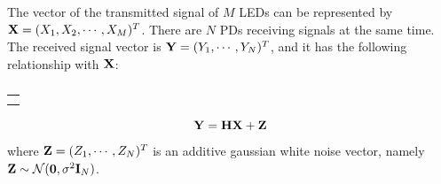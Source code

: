 \documentclass[conference]{IEEEtran}
\begin{document}
   The vector of the transmitted signal of $M$ LEDs can be 
   represented by ${\bf{X}} = {({X_1},{X_2}, \cdots ,{X_M})^T}$. 
   There are $N$ PDs receiving signals at the same 
   time. The received signal vector is ${\bf{Y}} = {({Y_1}, \cdots ,{Y_N})^T}$, 
   and it has the following relationship with ${\bf{X}}$:
      \begin{table}
      \centering
      \caption*{}
      \begin{tabular*}{\textwidth}{@{\extracolsep{\fill}} c}
      \textbf{ \begin{minipage}{1\textwidth}
      \begin{equation}
      h_{n,k,m}^{\rm{(IRS)}} = \left\{ \begin{array}{l}
      \dfrac{{(\kappa  + 1){A_{{\rm{PD}}}}{{\cos }^\kappa }(\phi _{m,k}^{{\rm{LR}}})\cos (\psi _{k,n}^{{\rm{RD}}})\cos (\theta _{k,n}^{{\rm{RD}}})}}{{2\pi {{\left( {{d_{kn}} + {d_{km}}} \right)}^2}
      {{{\rm{(}}{\overrightarrow{\rm N}}{_k^{{\rm{IRS}}}}{\rm{)}}^T}}
      {\overrightarrow{\rm E}}{_{k,n}^{{\rm{RD}}}}}}{T_s}(\psi _{k,n}^{{\rm{RD}}})g(\psi _{k,n}^{{\rm{RD}}}),0 < \psi _{k,n}^{{\rm{RD}}} < {\Psi _C}\\
      \\ 0,{\kern 231pt} \psi _{k,n}^{{\rm{RD}}} > {\Psi _C}
      \end{array} 
      \right.
      \tag{5}
      \label{eq5}
      \end{equation}
      \end{minipage}
      }\\\\
      \bottomrule
      \end{tabular*}
      \end{table}

     \begin{equation}
     \bf{Y} = \bf{HX} + \bf{Z} \label{eq1}
     \end{equation}
   where ${\bf{Z}} = {({Z_1}, \cdots ,{Z_N})^T}$ is an additive gaussian white noise 
   vector, namely ${\bf{Z}}\sim {\cal N}({\bf{0}},{\sigma ^2}{{\bf{I}}_N})$.
\end{document}

